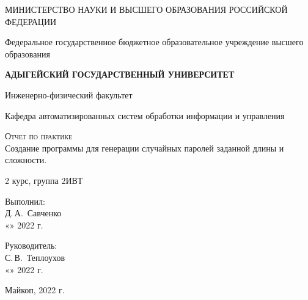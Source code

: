 \documentclass[14pt,a4paper]{scrartcl}
\begin{document}
 
\begin{titlepage} 
    \begin{center}
        \large
        МИНИСТЕРСТВО НАУКИ И ВЫСШЕГО ОБРАЗОВАНИЯ РОССИЙСКОЙ ФЕДЕРАЦИИ
        
        Федеральное государственное бюджетное образовательное учреждение высшего образования
        
        \textbf{АДЫГЕЙСКИЙ ГОСУДАРСТВЕННЫЙ УНИВЕРСИТЕТ}
        \vspace{0.25cm}
        
        Инженерно-физический факультет
        
        Кафедра автоматизированных систем обработки информации и управления
        \vfill

        \vfill
        
        \textsc{Отчет по практике}\\[5mm]
        
        {\LARGE Создание программы для генерации случайных паролей заданной
длины и сложности. }
        \bigskip
        
        2 курс, группа 2ИВТ
    \end{center}
    \vfill
    
    \newlength{\ML}
    \hfill\begin{minipage}{0.5\textwidth}
        Выполнил:\\
        \underline{\hspace{\ML}} Д.\,А.~Савченко\\
        «\underline{\hspace{0.7cm}}» \underline{\hspace{2cm}} 2022 г.
    \end{minipage}%
    \bigskip
    
    \hfill\begin{minipage}{0.5\textwidth}
        Руководитель:\\
        \underline{\hspace{\ML}} С.\,В.~Теплоухов\\
        «\underline{\hspace{0.7cm}}» \underline{\hspace{2cm}} 2022 г.
    \end{minipage}%
    \vfill
    
    \begin{center}
        Майкоп, 2022 г.
    \end{center}
\end{titlepage}
\tableofcontents
\newpage
\end{document}
